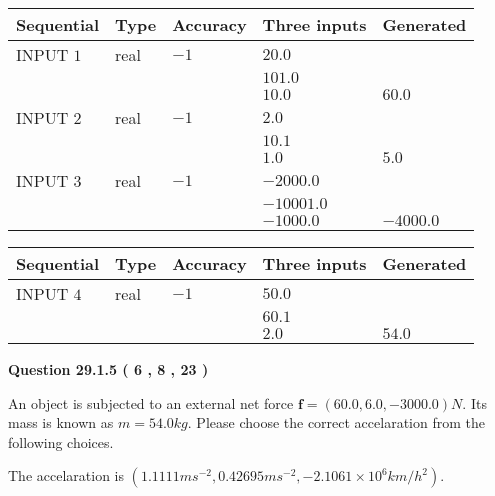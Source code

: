 \documentclass[12pt]{article}
\begin{document}
   
  
  
\noindent\begin{tabular}{|l|l|l|l|l|}
\hline
 Sequential & Type & Accuracy & Three inputs & Generated \\ 
\hline
 
 
  INPUT $            1 $ & real & $           -1  $ & $
 20.0
  $ & \\
  & & &  $
 101.0
  $ & \\
  & & &  $
 10.0
 $ & $ 60.0 $ 
 \\  \hline  
 
 
  INPUT $            2 $ & real & $           -1  $ & $
 2.0
  $ & \\
  & & &  $
 10.1
  $ & \\
  & & &  $
 1.0
 $ & $ 5.0 $ 
 \\  \hline  
 
 
  INPUT $            3 $ & real & $           -1  $ & $
 -2000.0
  $ & \\
  & & &  $
 -10001.0
  $ & \\
  & & &  $
 -1000.0
 $ & $ -4000.0 $ 
 \\  \hline  
 \end{tabular}
   
   
  
  
\noindent\begin{tabular}{|l|l|l|l|l|}
\hline
 Sequential & Type & Accuracy & Three inputs & Generated \\ 
\hline
 
 
  INPUT $            4 $ & real & $           -1  $ & $
 50.0
  $ & \\
  & & &  $
 60.1
  $ & \\
  & & &  $
 2.0
 $ & $ 54.0 $ 
 \\  \hline  
 \end{tabular}
   
   
  
\vspace{0.2in}
  
{\textbf{\Large{Question
29.1.5 
 (           6 ,           8 ,          23 )
}}}
  
  
 
An object is subjected to an external net force $\mathbf{f}=(
60.0 ,
6.0,
-3000.0  )N$. Its mass is known as
$m= %
54.0  kg$. Please choose the correct accelaration
from the following choices.
 
 
 
The accelaration is
$(
1.1111ms^{-2},
0.42695ms^{-2},
-2.1061 \times 10^{6}km/h^2
).
$
 
\end{document}
